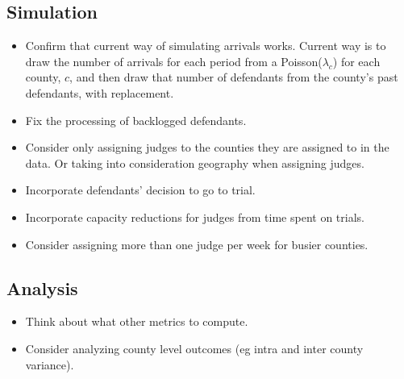 \documentclass[11pt]{article}
\begin{document}
  \subsection{Simulation}
    \begin{itemize}
      \item Confirm that current way of simulating arrivals works. Current way is to draw the number of arrivals for each period from a Poisson($\lambda_c$) for each county, $c$, and then draw that number of defendants from the county's past defendants, with replacement.
      \item Fix the processing of backlogged defendants.
      \item Consider only assigning judges to the counties they are assigned to in the data. Or taking into consideration geography when assigning judges.
      \item Incorporate defendants' decision to go to trial.
      \item Incorporate capacity reductions for judges from time spent on trials.
      \item Consider assigning more than one judge per week for busier counties.
    \end{itemize}

  \subsection{Analysis}
    \begin{itemize}
      \item Think about what other metrics to compute.
      \item Consider analyzing county level outcomes (eg intra and inter county variance).
    \end{itemize}
\end{document}
